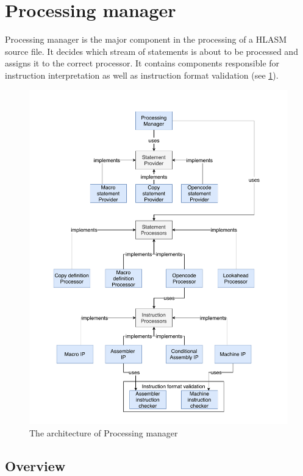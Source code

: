 \section{Processing manager}

Processing manager is the major component in the processing of a HLASM source file. It decides which stream of statements is about to be processed and assigns it to the correct processor. It contains components responsible for instruction interpretation as well as instruction format validation (see \cref{fig06:proc_mngr}). 

\begin{figure}
	\centering
	\includegraphics[width=\textwidth]{img/processing_manager_arch}
	\caption{The architecture of Processing manager}
	\label{fig06:proc_mngr}
\end{figure}

\subsection{Overview}

